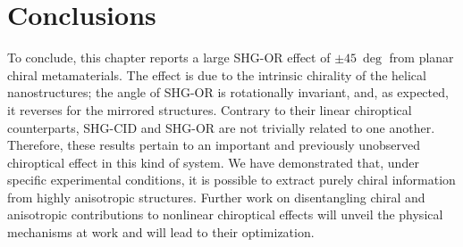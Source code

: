 \section{Conclusions}\label{sec:results:OAinPlanarNanohelices:conclusions}
To conclude, this chapter reports a large SHG-OR effect of $\pm \SI{45}{\deg}$ from planar chiral metamaterials. The effect is due to the intrinsic chirality of the helical nanostructures; the angle of SHG-OR is rotationally invariant, and, as expected, it reverses for the mirrored structures. Contrary to their linear chiroptical counterparts, SHG-CID and SHG-OR are not trivially related to one another. Therefore, these results pertain to an important and previously unobserved chiroptical effect in this kind of system. We have demonstrated that, under specific experimental conditions, it is possible to extract purely chiral information from highly anisotropic structures. Further work on disentangling chiral and anisotropic contributions to nonlinear chiroptical effects will unveil the physical mechanisms at work and will lead to their optimization. 